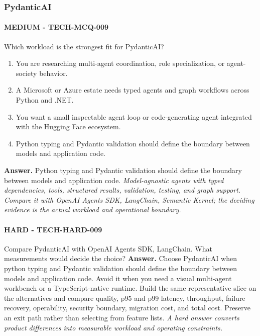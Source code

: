 \subsubsection*{PydanticAI}
\paragraph{MEDIUM - TECH-MCQ-009} Which workload is the strongest fit for PydanticAI?
\begin{enumerate}[label=\Alph*.]
\item You are researching multi-agent coordination, role specialization, or agent-society behavior.
\item A Microsoft or Azure estate needs typed agents and graph workflows across Python and .NET.
\item You want a small inspectable agent loop or code-generating agent integrated with the Hugging Face ecosystem.
\item Python typing and Pydantic validation should define the boundary between models and application code.
\end{enumerate}
\textbf{Answer.} Python typing and Pydantic validation should define the boundary between models and application code.
\textit{Model-agnostic agents with typed dependencies, tools, structured results, validation, testing, and graph support. Compare it with OpenAI Agents SDK, LangChain, Semantic Kernel; the deciding evidence is the actual workload and operational boundary.}
\paragraph{HARD - TECH-HARD-009} Compare PydanticAI with OpenAI Agents SDK, LangChain. What measurements would decide the choice?
\textbf{Answer.} Choose PydanticAI when python typing and Pydantic validation should define the boundary between models and application code. Avoid it when you need a visual multi-agent workbench or a TypeScript-native runtime. Build the same representative slice on the alternatives and compare quality, p95 and p99 latency, throughput, failure recovery, operability, security boundary, migration cost, and total cost. Preserve an exit path rather than selecting from feature lists.
\textit{A hard answer converts product differences into measurable workload and operating constraints.}
